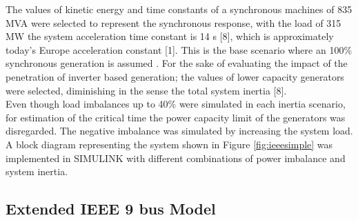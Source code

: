 The values of kinetic energy and time constants of a synchronous machines of 835 MVA were selected to represent the synchronous response, with the load of 315 MW the system acceleration time constant is 14 s [8], which is approximately today’s Europe acceleration constant [1]. This is the base scenario where an 100\% synchronous generation is assumed . For the sake of evaluating the impact of the penetration of inverter based generation; the values of lower capacity generators were selected, diminishing in the sense the total system inertia [8].\\%





Even though load imbalances up to 40\% were simulated in each inertia scenario, for estimation of the critical time the power capacity limit of the generators was disregarded. The negative imbalance was simulated by increasing the system load. A block diagram representing the system shown in Figure \ref{fig:ieeesimple} was implemented in SIMULINK with different combinations of power imbalance and system inertia. %

\subsection{Extended IEEE 9 bus Model}


